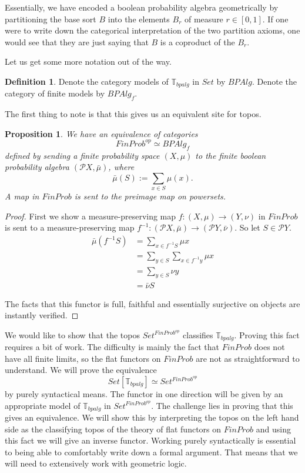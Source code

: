 \documentclass[a4paper]{amsproc}
\theoremstyle{plain}
\newtheorem{proposition}[theorem]{Proposition}
\theoremstyle{definition}
\newtheorem{definition}[theorem]{Definition}
\theoremstyle{remark}
\numberwithin{equation}{section}
\begin{document}
Essentially, we have encoded a boolean probability algebra geometrically by partitioning the base sort $B$ into the elements $B_r$ of measure $r \in [0,1]$. If one were to write down the categorical interpretation of the two partition axioms, one would see that they are just saying that $B$ is a coproduct of the $B_r$.

Let us get some more notation out of the way.

\begin{definition}
Denote the category models of $\mathbb{T}_{bpalg}$ in $Set$ by $BPAlg$. Denote the category of finite models by $BPAlg_f$.
\end{definition}

The first thing to note is that this gives us an equivalent site for topos.

\begin{proposition} \label{finprob_equiv}
We have an equivalence of categories
\[
FinProb^{op} \simeq BPAlg_f
\]
defined by sending a finite probability space $(X, \mu)$ to the finite boolean probability algebra $(\mathcal{P} X, \bar{\mu})$, where
\[
\bar{\mu}(S) := \sum_{x \in S} \mu(x).
\]
A map in $FinProb$ is sent to the preimage map on powersets.
\end{proposition}
\begin{proof}
First we show a measure-preserving map $f: (X,\mu) \to (Y,\nu)$ in $FinProb$ is sent to a measure-preserving map $f^{-1}: (\mathcal{P}X, \bar{\mu}) \to (\mathcal{P}Y, \bar{\nu})$. So let $S \in \mathcal{P} Y$.
\begin{align*}
\bar{\mu}(f^{-1} S) &= \sum_{x \in f^{-1} S} \mu x \\
&= \sum_{y \in S} \sum_{x \in f^{-1} y} \mu x \\
&= \sum_{y \in S} \nu y \\
&= \bar{\nu} S
\end{align*}

The facts that this functor is full, faithful and essentially surjective on objects are instantly verified.
\end{proof}

We would like to show that the topos $Set^{FinProb^{op}}$ classifies $\mathbb{T}_{bpalg}$. Proving this fact requires a bit of work. The difficulty is mainly the fact that  $FinProb$ does not have all finite limits, so the flat functors on $FinProb$ are not as straightforward to understand. We will prove the equivalence
\[
Set[\mathbb{T}_{bpalg}] \simeq Set^{FinProb^{op}}
\]
by purely syntactical means. The functor in one direction will be given by an appropriate model of $\mathbb{T}_{bpalg}$ in $Set^{FinProb^{op}}$. The challenge lies in proving that this gives an equivalence. We will show this by interpreting the topos on the left hand side as the classifying topos of the theory of flat functors on $FinProb$ and using this fact we will give an inverse functor. Working purely syntactically is essential to being able to comfortably write down a formal argument. That means that we will need to extensively work with geometric logic.
\end{document}
